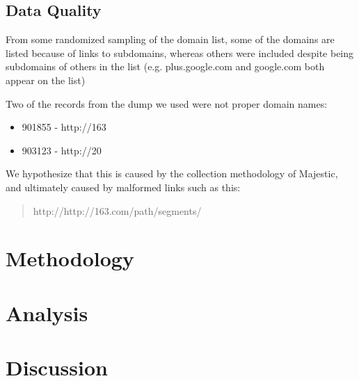 \documentclass{idc_msc}
\begin{document}


\subsection{Data Quality}

From some randomized sampling of the domain list, some of the domains are listed because of links to subdomains, whereas others were included despite being subdomains of others in the list (e.g. plus.google.com and google.com both appear on the list)

Two of the records from the dump we used were not proper domain names:

\begin{itemize}
  \item 901855 - http://163
  \item 903123 - http://20
\end{itemize}

We hypothesize that this is caused by the collection methodology of Majestic, and ultimately caused by malformed links such as this:

\begin{quote}
http://http://163.com/path/segments/
\end{quote}





\section{Methodology}


\section{Analysis}


\section{Discussion}

\end{document}
